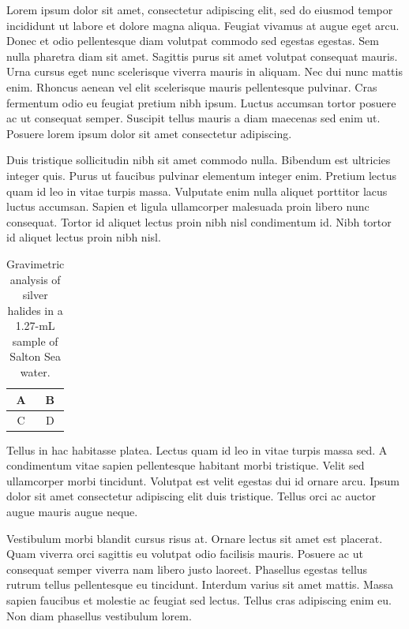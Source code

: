 \documentclass[letterpaper,\myfontsize]{article}
\begin{document}
Lorem ipsum dolor sit amet, consectetur adipiscing elit, sed do eiusmod tempor incididunt ut labore et dolore magna aliqua. Feugiat vivamus at augue eget arcu. Donec et odio pellentesque diam volutpat commodo sed egestas egestas. Sem nulla pharetra diam sit amet. Sagittis purus sit amet volutpat consequat mauris. Urna cursus eget nunc scelerisque viverra mauris in aliquam. Nec dui nunc mattis enim. Rhoncus aenean vel elit scelerisque mauris pellentesque pulvinar. Cras fermentum odio eu feugiat pretium nibh ipsum. Luctus accumsan tortor posuere ac ut consequat semper. Suscipit tellus mauris a diam maecenas sed enim ut. Posuere lorem ipsum dolor sit amet consectetur adipiscing. 

Duis tristique sollicitudin nibh sit amet commodo nulla. Bibendum est ultricies integer quis. Purus ut faucibus pulvinar elementum integer enim. Pretium lectus quam id leo in vitae turpis massa. Vulputate enim nulla aliquet porttitor lacus luctus accumsan. Sapien et ligula ullamcorper malesuada proin libero nunc consequat. Tortor id aliquet lectus proin nibh nisl condimentum id. Nibh tortor id aliquet lectus proin nibh nisl.

\begin{table}[htbp]
	\centering
	\caption{Gravimetric analysis of silver halides in a 1.27-mL sample of Salton Sea water.}
          \begin{tabular}{cc}
                \toprule
                A & B \\
                \midrule
                C & D \\
                \bottomrule      
          \end{tabular}
    \label{tabgrav}
\end{table}

Tellus in hac habitasse platea. Lectus quam id leo in vitae turpis massa sed. A condimentum vitae sapien pellentesque habitant morbi tristique. Velit sed ullamcorper morbi tincidunt. Volutpat est velit egestas dui id ornare arcu. Ipsum dolor sit amet consectetur adipiscing elit duis tristique. Tellus orci ac auctor augue mauris augue neque. 

Vestibulum morbi blandit cursus risus at. Ornare lectus sit amet est placerat. Quam viverra orci sagittis eu volutpat odio facilisis mauris. Posuere ac ut consequat semper viverra nam libero justo laoreet. Phasellus egestas tellus rutrum tellus pellentesque eu tincidunt. Interdum varius sit amet mattis. Massa sapien faucibus et molestie ac feugiat sed lectus. Tellus cras adipiscing enim eu. Non diam phasellus vestibulum lorem.
                 
\end{document}

